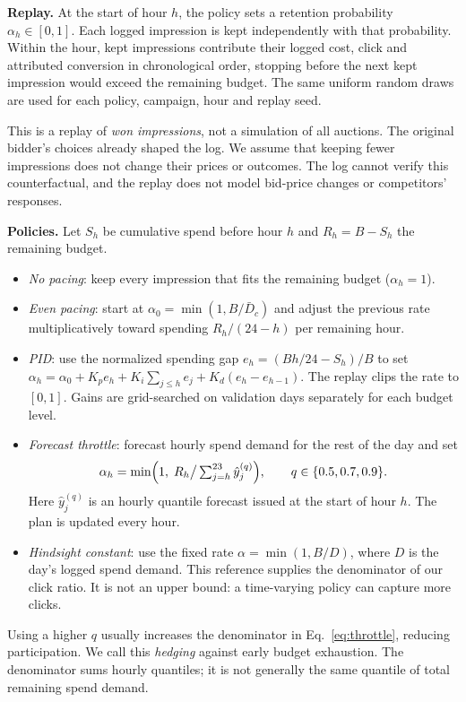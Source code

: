 \documentclass[sigconf,nonacm]{acmart}
\begin{document}
\textbf{Replay.} At the start of hour $h$, the policy sets a retention
probability $\alpha_h\in[0,1]$. Each logged impression is kept independently
with that probability. Within the hour, kept impressions contribute their
logged cost, click and attributed conversion in chronological order, stopping
before the next kept impression would exceed the remaining budget. The same
uniform random draws are used for each policy, campaign, hour and replay seed.

This is a replay of \emph{won impressions}, not a simulation of all auctions.
The original bidder's choices already shaped the log. We assume that keeping
fewer impressions does not change their prices or outcomes. The log cannot
verify this counterfactual, and the replay does not model bid-price changes or
competitors' responses.

\textbf{Policies.} Let $S_h$ be cumulative spend before hour $h$ and
$R_h=B-S_h$ the remaining budget.
\begin{itemize}
  \item \emph{No pacing}: keep every impression that fits the remaining budget
        ($\alpha_h=1$).
  \item \emph{Even pacing}: start at $\alpha_0=\min(1,B/\bar D_c)$ and adjust
        the previous rate multiplicatively toward spending $R_h/(24-h)$ per
        remaining hour.
  \item \emph{PID}: use the normalized spending gap $e_h=(Bh/24-S_h)/B$ to set
        $\alpha_h=\alpha_0+K_pe_h+K_i\sum_{j\leq h}e_j+K_d(e_h-e_{h-1})$.
        The replay clips the rate to $[0,1]$. Gains are grid-searched on
        validation days separately for each budget level.
  \item \emph{Forecast throttle}: forecast hourly spend demand for the rest of
        the day and set
        \begin{equation}
          \alpha_h = \min\Bigl(1,\; R_h \big/ \textstyle\sum_{j=h}^{23} \hat{y}^{(q)}_j\Bigr),
          \qquad q \in \{0.5, 0.7, 0.9\}.
          \label{eq:throttle}
        \end{equation}
        Here $\hat y_j^{(q)}$ is an hourly quantile forecast issued at the
        start of hour $h$. The plan is updated every hour.
  \item \emph{Hindsight constant}: use the fixed rate $\alpha=\min(1,B/D)$,
        where $D$ is the day's logged spend demand. This reference supplies
        the denominator of our click ratio. It is not an upper bound: a
        time-varying policy can capture more clicks.
\end{itemize}
Using a higher $q$ usually increases the denominator in
Eq.~\eqref{eq:throttle}, reducing participation. We call this \emph{hedging}
against early budget exhaustion. The denominator sums hourly quantiles; it is
not generally the same quantile of total remaining spend demand.
\end{document}
